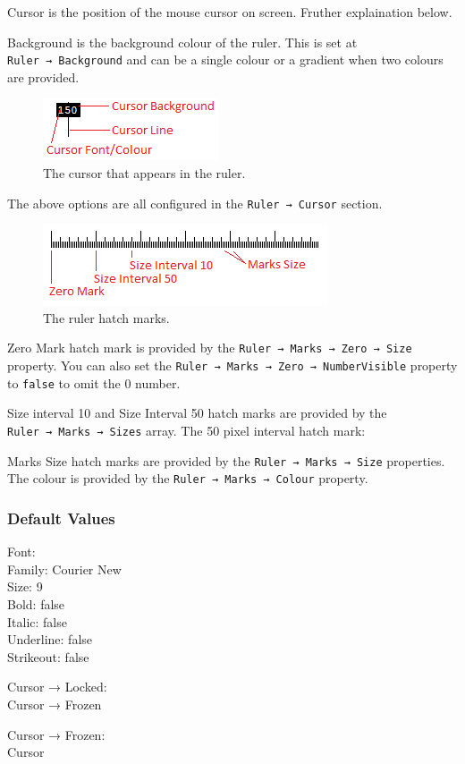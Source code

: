 \documentclass[
]{book}
\newenvironment{Shaded}{\begin{snugshade}}{\end{snugshade}}
\newcommand{\CommentTok}[1]{\textcolor[rgb]{0.56,0.35,0.01}{\textit{#1}}}
\begin{document}
Cursor is the position of the mouse cursor on screen.
Fruther explaination below.

Background is the background colour of the ruler.
This is set at \texttt{Ruler\ →\ Background} and can be a single colour or a gradient when two colours are provided.

\begin{figure}
\centering
\includegraphics{images/ruler-cursor.png}
\caption{\label{fig:unnamed-chunk-5}The cursor that appears in the ruler.}
\end{figure}

The above options are all configured in the \texttt{Ruler\ →\ Cursor} section.

\begin{figure}
\centering
\includegraphics{images/ruler-hashmarks.png}
\caption{\label{fig:unnamed-chunk-6}The ruler hatch marks.}
\end{figure}

Zero Mark hatch mark is provided by the \texttt{Ruler\ →\ Marks\ →\ Zero\ →\ Size} property.
You can also set the \texttt{Ruler\ →\ Marks\ →\ Zero\ →\ NumberVisible} property to \texttt{false} to omit the 0 number.

Size interval 10 and Size Interval 50 hatch marks are provided by the \texttt{Ruler\ →\ Marks\ →\ Sizes} array.
The 50 pixel interval hatch mark:

\begin{Shaded}
\end{Shaded}

Marks Size hatch marks are provided by the \texttt{Ruler\ →\ Marks\ →\ Size} properties.
The colour is provided by the \texttt{Ruler\ →\ Marks\ →\ Colour} property.

\hypertarget{default-values}{%
\subsubsection{Default Values}\label{default-values}}

Font:\\
Family: Courier New\\
Size: 9\\
Bold: false\\
Italic: false\\
Underline: false\\
Strikeout: false

Cursor → Locked:\\
Cursor → Frozen

Cursor → Frozen:\\
Cursor
\end{document}
